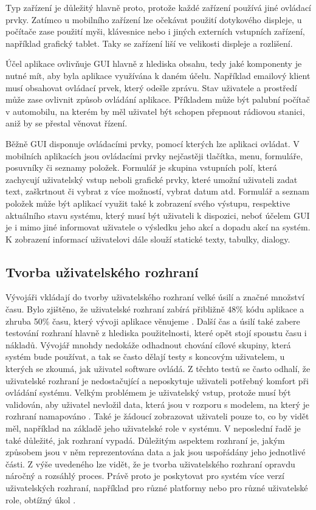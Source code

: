 Typ zařízení je důležitý hlavně proto, protože každé zařízení používá jiné ovládací prvky. Zatímco u mobilního zařízení lze očekávat použití dotykového displeje, u počítače zase použití myši, klávesnice nebo i jiných externích vstupních zařízení, například grafický tablet. Taky se zařízení liší ve velikosti displeje a rozlišení. 

Účel aplikace ovlivňuje GUI hlavně z hlediska obsahu, tedy jaké komponenty je nutné mít, aby byla aplikace využívána k daném účelu. Například emailový klient musí obsahovat ovládací prvek, který odešle zprávu. Stav uživatele a prostředí může zase ovlivnit způsob ovládání aplikace. Příkladem může být palubní počítač v automobilu, na kterém by měl uživatel být schopen přepnout rádiovou stanici, aniž by se přestal věnovat řízení. 

Běžně GUI disponuje ovládacími prvky, pomocí kterých lze aplikaci ovládat. V mobilních aplikacích jsou ovládacími prvky nejčastěji tlačítka, menu, formuláře, posuvníky či seznamy položek. Formulář je skupina vstupních polí, která zachycují uživatelský vstup neboli grafické prvky, které umožní uživateli zadat text, zaškrtnout či vybrat z více možností, vybrat datum atd. Formulář a seznam položek může být aplikací využit také k zobrazení svého výstupu, respektive aktuálního stavu systému, který musí být uživateli k dispozici, neboť účelem GUI je i mimo jiné informovat uživatele o výsledku jeho akcí a dopadu akcí na systém. K zobrazení informací uživatelovi dále slouží statické texty, tabulky, dialogy. 

\subsection{Tvorba uživatelského rozhraní}

Vývojáři vkládají do tvorby uživatelského rozhraní velké úsilí a značné množství času. Bylo zjištěno, že uživatelské rozhraní zabírá přibližně 48\% kódu aplikace a zhruba 50\% času, který vývoji aplikace věnujeme \cite{towards-smart-design}. Další čas a úsilí také zabere testování rozhraní hlavně z hlediska použitelnosti, které opět stojí spoustu času i nákladů. Vývojář mnohdy nedokáže odhadnout chování cílové skupiny, která systém bude používat, a tak se často dělají testy s koncovým uživatelem, u kterých se zkoumá, jak uživatel software ovládá. Z těchto testů se často odhalí, že uživatelské rozhraní je nedostačující a neposkytuje uživateli potřebný komfort při ovládání systému. Velkým problémem je uživatelský vstup, protože musí být validován, aby uživatel nevložil data, která jsou v rozporu s modelem, na který je rozhraní namapováno \cite{cernyTEA}. Také je žádoucí zobrazovat uživateli pouze to, co by vidět měl, například na základě jeho uživatelské role v systému. V neposlední řadě je také důležité, jak rozhraní vypadá. Důležitým aspektem rozhraní je, jakým způsobem jsou v něm reprezentována data a jak jsou uspořádány jeho jednotlivé části. Z výše uvedeného lze vidět, že je tvorba uživatelského rozhraní opravdu náročný a rozsáhlý proces. Právě proto je poskytovat pro systém více verzí uživatelských rozhraní, například pro různé platformy nebo pro různé uživatelské role, obtížný úkol \cite{cernyTEA}.

